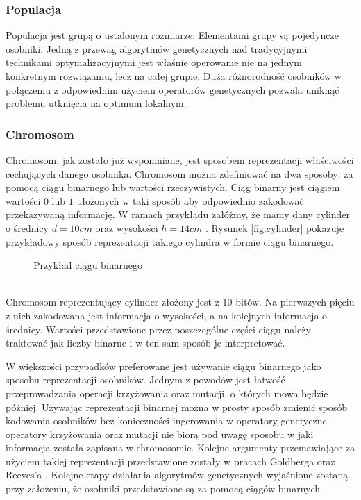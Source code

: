 \documentclass[twoside]{iisthesis}
\begin{document}
\subsubsection{Populacja}
Populacja jest grupą o ustalonym rozmiarze. Elementami grupy są pojedyncze osobniki. Jedną z przewag algorytmów genetycznych nad tradycyjnymi technikami optymalizacyjnymi jest właśnie operowanie nie na jednym konkretnym rozwiązaniu, lecz na całej grupie. Duża różnorodność osobników w połączeniu z odpowiednim użyciem operatorów genetycznych pozwala uniknąć problemu utknięcia na optimum lokalnym.
\subsubsection{Chromosom}
Chromosom, jak zostało już wspomniane, jest sposobem reprezentacji właściwości cechujących danego osobnika. Chromosom można zdefiniować na dwa sposoby: za pomocą ciągu binarnego lub wartości rzeczywistych. Ciąg binarny jest ciągiem wartości $0$ lub $1$ ułożonych w taki sposób aby odpowiednio zakodować przekazywaną informację. W ramach przykładu załóżmy, że mamy dany cylinder o średnicy $d = 10 cm$ oraz wysokości $h = 14 cm$ \cite{book}. Rysunek \eqref{fig:cylinder} pokazuje przykładowy sposób reprezentacji takiego cylindra w formie ciągu binarnego. 
\begin{figure}[!htb]
	\centering
	\caption{Przykład ciągu binarnego}
	\label{fig:cylinder}
\end{figure}
\\Chromosom reprezentujący cylinder złożony jest z 10 bitów. Na pierwszych pięciu z nich zakodowana jest informacja o wysokości, a na kolejnych informacja o średnicy. Wartości przedstawione przez poszczególne części ciągu należy traktować jak liczby binarne i w ten sam sposób je interpretować.

W większości przypadków preferowane jest używanie ciągu binarnego jako sposobu reprezentacji osobników. Jednym z powodów jest łatwość przeprowadzania operacji krzyżowania oraz mutacji, o których mowa będzie później. Używając reprezentacji binarnej można w prosty sposób zmienić sposób kodowania osobników bez konieczności ingerowania w operatory genetyczne - operatory krzyżowania oraz mutacji nie biorą pod uwagę sposobu w jaki informacja została zapisana w chromosomie. Kolejne argumenty przemawiające za użyciem takiej reprezentacji przedstawione zostały w pracach Goldberga \cite{goldberg} oraz Reeves'a \cite{reeves}. Kolejne etapy działania algorytmów genetycznych wyjaśnione zostaną przy założeniu, że osobniki przedstawione są za pomocą ciągów binarnych.
\end{document}
